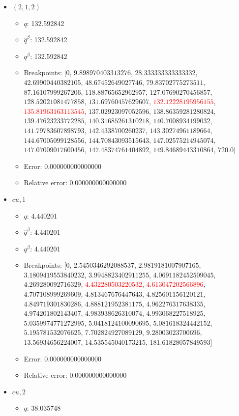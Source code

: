 \documentclass{article}%
\begin{document}
\begin{itemize}
	\item $(2, 1, 2)$%
	\begin{itemize}%
		\item $q$: 132.592842%
		\item $\hat{q}^\beta$: 132.592842%
		\item $q^\beta$: 132.592842%
		\item Breakpoints: $[$$0$, $9.898970403313276$, $28.333333333333332$, $42.69900440382105$, $48.67452649027746$, $79.83702775273511$, $87.16107999267206$, $118.88765652962957$, $127.07690270456857$, $128.52021081477858$, $131.69760457629607$, \textcolor{red}{$132.12228195956155$}, \textcolor{red}{$135.81963163113545$}, $137.02923097052596$, $138.86359281280824$, $139.47623233772285$, $140.31685261310218$, $140.7008934199032$, $141.79783607898793$, $142.4338700260237$, $143.30274961189664$, $144.67005099128556$, $144.70843093515643$, $147.02575214945074$, $147.07009017600456$, $147.48374761404892$, $149.84689443310864$, $720.0$$]$%
		\item Error: 0.000000000000000%
		\item Relative error: 0.000000000000000%
	\end{itemize}%
	\item $\textit{cu},1$%
	\begin{itemize}%
		\item $q$: 4.440201%
		\item $\hat{q}^\beta$: 4.440201%
		\item $q^\beta$: 4.440201%
		\item Breakpoints: $[$$0$, $2.5450346292088537$, $2.9819181007907165$, $3.1809419553840232$, $3.9948823402911255$, $4.0691182452509045$, $4.269280092716329$, \textcolor{red}{$4.432280503220532$}, \textcolor{red}{$4.613047202566896$}, $4.707108999269609$, $4.813467676447643$, $4.825601156120121$, $4.849719301830286$, $4.888121952381175$, $4.962276317638335$, $4.974201802143407$, $4.983938626310074$, $4.993068227518925$, $5.0359974771272995$, $5.0418124100090695$, $5.081618324442152$, $5.195781532076625$, $7.702824927089129$, $9.28003023700696$, $13.56934656224007$, $14.535545040173215$, $181.61828057849593$$]$%
		\item Error: 0.000000000000000%
		\item Relative error: 0.000000000000000%
	\end{itemize}%
	\item $\textit{cu},2$%
	\begin{itemize}%
		\item $q$: 38.035748%

\end{itemize}
\end{itemize}
\end{document}
